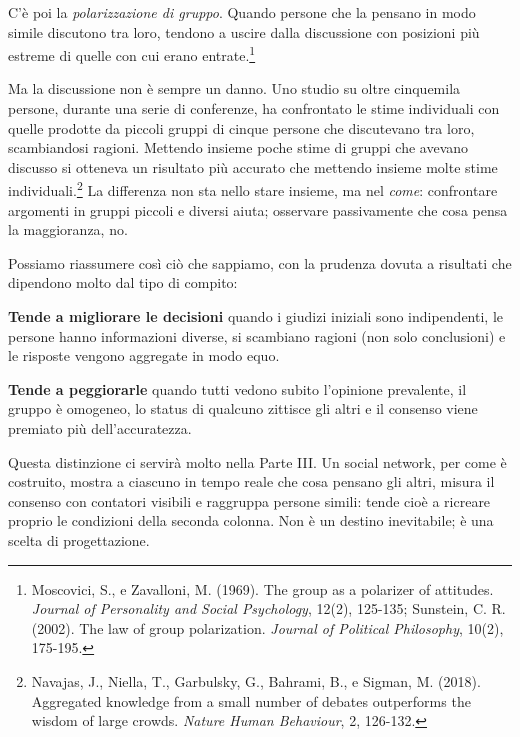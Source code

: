 C'è poi la \textit{polarizzazione di gruppo}. Quando persone che la pensano in modo simile discutono tra loro, tendono a uscire dalla discussione con posizioni più estreme di quelle con cui erano entrate.\footnote{Moscovici, S., e Zavalloni, M. (1969). The group as a polarizer of attitudes. \textit{Journal of Personality and Social Psychology}, 12(2), 125-135; Sunstein, C. R. (2002). The law of group polarization. \textit{Journal of Political Philosophy}, 10(2), 175-195.}

Ma la discussione non è sempre un danno. Uno studio su oltre cinquemila persone, durante una serie di conferenze, ha confrontato le stime individuali con quelle prodotte da piccoli gruppi di cinque persone che discutevano tra loro, scambiandosi ragioni. Mettendo insieme poche stime di gruppi che avevano discusso si otteneva un risultato più accurato che mettendo insieme molte stime individuali.\footnote{Navajas, J., Niella, T., Garbulsky, G., Bahrami, B., e Sigman, M. (2018). Aggregated knowledge from a small number of debates outperforms the wisdom of large crowds. \textit{Nature Human Behaviour}, 2, 126-132.} La differenza non sta nello stare insieme, ma nel \textit{come}: confrontare argomenti in gruppi piccoli e diversi aiuta; osservare passivamente che cosa pensa la maggioranza, no.

Possiamo riassumere così ciò che sappiamo, con la prudenza dovuta a risultati che dipendono molto dal tipo di compito:

\begin{concetto}
\textbf{Tende a migliorare le decisioni} quando i giudizi iniziali sono indipendenti, le persone hanno informazioni diverse, si scambiano ragioni (non solo conclusioni) e le risposte vengono aggregate in modo equo.

\textbf{Tende a peggiorarle} quando tutti vedono subito l'opinione prevalente, il gruppo è omogeneo, lo status di qualcuno zittisce gli altri e il consenso viene premiato più dell'accuratezza.
\end{concetto}


Questa distinzione ci servirà molto nella Parte III. Un social network, per come è costruito, mostra a ciascuno in tempo reale che cosa pensano gli altri, misura il consenso con contatori visibili e raggruppa persone simili: tende cioè a ricreare proprio le condizioni della seconda colonna. Non è un destino inevitabile; è una scelta di progettazione.

